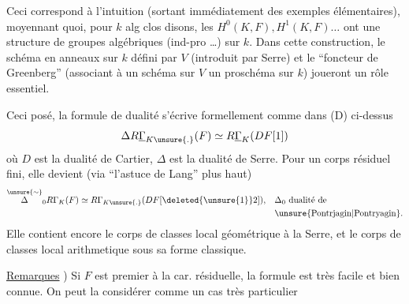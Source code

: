 Ceci correspond à l'intuition (sortant immédiatement des exemples élémentaires), moyennant quoi, pour $k$ alg clos disons, les $H^0(K,F), H^1(K,F)\ldots$ ont une structure de groupes algébriques (ind-pro \ldots) sur $k$. Dans cette construction, le schéma en anneaux sur $k$ défini par $V$ (introduit par Serre) et le ``foncteur de Greenberg'' (associant à un schéma sur $V$ un proschéma sur $k$) joueront un rôle essentiel.

Ceci posé, la formule de dualité s'écrive formellement comme dans (D) ci-dessus
\[
 \Delta R\underline{\Gamma}_{K\unsure{.}}(F)\simeq R\underline{\Gamma}_K(DF[1])
\]
où $D$ est la dualité de Cartier, $\Delta$ est la dualité de Serre. Pour un corps résiduel fini, elle devient (via ``l'astuce de Lang'' plus haut)
\[
 \begin{aligned}
 \overset{\unsure{\sim}}{\Delta}_0 R\Gamma_K(F)\simeq R\Gamma_{K\unsure{.}}(DF[\deleted{\unsure{1}}2]),&\quad \Delta_0\ \text{dualité de}\\
 &\quad\text{\unsure{Pontrjagin|Pontryagin}.}
 \end{aligned}
\]
Elle contient encore le corps de classes local géométrique à la Serre, et le corps de classes local arithmetique sous sa forme classique.

\uline{Remarques} ) Si $F$ est premier à la car. résiduelle, la formule est très facile et bien connue. On peut la considérer comme un cas très particulier
